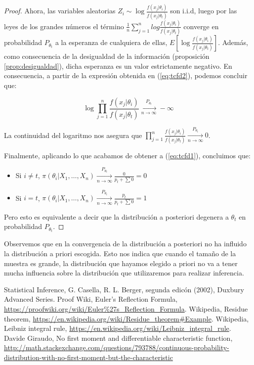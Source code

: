 \documentclass{article}
\begin{document}
\begin{proof}
	Ahora, las variables aleatorias $Z_i \sim \log{\frac{f(x_j|\theta_i)}{f(x_j|\theta_t)}}$ son i.i.d, luego por las leyes de los grandes números el término $\frac{1}{n}\sum_{j=1}^{n}{log{\frac{f(x_j|\theta_i)}{f(x_j|\theta_t)}}}$ converge en probabilidad $P_{\theta_t}$ a la esperanza de cualquiera de ellas, $E\left[\log{\frac{f(x_j|\theta_i)}{f(x_j|\theta_t)}}\right]$. Además, como consecuencia de la desigualdad de la información (proposición \ref{prop:desigualdad}), dicha esperanza es un valor estrictamente negativo. En consecuencia, a partir de la expresión obtenida en (\ref{eq:tcfd2}), podemos concluir que:

	\[\log{\prod_{j=1}^n{\frac{f(x_j|\theta_i)}{f(x_j|\theta_t)}}} \xrightarrow[n\to\infty]{P_{\theta_t}} -\infty\]

	La continuidad del logaritmo nos asegura que $\prod_{j=1}^n{\frac{f(x_j|\theta_i)}{f(x_j|\theta_t)}} \xrightarrow[n\to\infty]{P_{\theta_t}} 0$.

	Finalmente, aplicando lo que acabamos de obtener a (\ref{eq:tcfd1}), concluimos que:

	\begin{itemize}
		\item Si $i \ne t$, $\pi(\theta_i|X_1,\dots,X_n) \xrightarrow[n\to\infty]{P_{\theta_t}} \frac{0}{p_t+\sum{0}} = 0$
		\item Si $i = t$, $\pi(\theta_i|X_1,\dots,X_n) \xrightarrow[n\to\infty]{P_{\theta_t}} \frac{p_t}{p_t+\sum{0}} = 1$
	\end{itemize}

	Pero esto es equivalente a decir que la distribución a posteriori degenera a $\theta_t$ en probabilidad $P_{\theta_t}$.
\end{proof}

\begin{remark}
	Observemos que en la convergencia de la distribución a posteriori no ha influido la distribución a priori escogida. Esto nos indica que cuando el tamaño de la muestra es grande, la distribución que hayamos elegido a priori no va a tener mucha influencia sobre la distribución que utilizaremos para realizar inferencia.
\end{remark}

\begin{thebibliography}{99}
 Statistical Inference, G. Casella, R. L. Berger, segunda edicón (2002), Duxbury Advanced Series.
 Proof Wiki, Euler's Reflection Formula, \url{https://proofwiki.org/wiki/Euler%27s_Reflection_Formula}.
 Wikipedia, Residue theorem, \url{https://en.wikipedia.org/wiki/Residue_theorem#Example}.
 Wikipedia, Leibniz integral rule, \url{https://en.wikipedia.org/wiki/Leibniz_integral_rule}.
 Davide Giraudo, No first moment and differentiable characteristic function, \url{http://math.stackexchange.com/questions/793788/continuous-probability-distribution-with-no-first-moment-but-the-characteristic}
\end{thebibliography}
\end{document}
